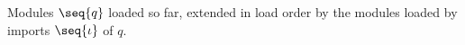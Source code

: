 Modules $\seq{q}$ loaded so far, extended in load order by the modules loaded by imports $\seq{\iota}$ of $q$.
